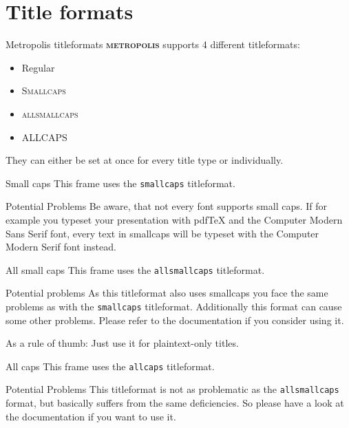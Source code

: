 \documentclass[10pt,aspectratio=169]{beamer} %
\newcommand{\themename}{\textbf{\textsc{metropolis}}\xspace}
\begin{document}
\section{Title formats}
\begin{frame}{Metropolis titleformats}
	\themename supports 4 different titleformats:
	\begin{itemize}
		\item Regular
		\item \textsc{Smallcaps}
		\item \textsc{allsmallcaps}
		\item ALLCAPS
	\end{itemize}
	They can either be set at once for every title type or individually.
\end{frame}
{
\begin{frame}{Small caps}
	This frame uses the \texttt{smallcaps} titleformat.

	\begin{alertblock}{Potential Problems}
		Be aware, that not every font supports small caps. If for example you typeset your presentation with pdfTeX and the Computer Modern Sans Serif font, every text in smallcaps will be typeset with the Computer Modern Serif font instead.
	\end{alertblock}
\end{frame}
}
{
\begin{frame}{All small caps}
	This frame uses the \texttt{allsmallcaps} titleformat.

	\begin{alertblock}{Potential problems}
		As this titleformat also uses smallcaps you face the same problems as with the \texttt{smallcaps} titleformat. Additionally this format can cause some other problems. Please refer to the documentation if you consider using it.

		As a rule of thumb: Just use it for plaintext-only titles.
	\end{alertblock}
\end{frame}
}
{
\begin{frame}{All caps}
	This frame uses the \texttt{allcaps} titleformat.

	\begin{alertblock}{Potential Problems}
		This titleformat is not as problematic as the \texttt{allsmallcaps} format, but basically suffers from the same deficiencies. So please have a look at the documentation if you want to use it.
	\end{alertblock}
\end{frame}
}
\end{document}
